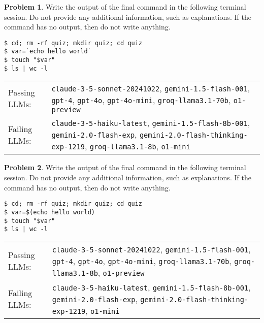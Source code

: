 \documentclass[10pt]{article}
\theoremstyle{definition}
\newtheorem{problem}{Problem}
\begin{document}
\begin{samepage}

\begin{problem}
Write the output of the final command in the following terminal session.
Do not provide any additional information,
such as explanations.
If the command has no output,
then do not write anything.

\end{problem}
\begin{lstlisting}
$ cd; rm -rf quiz; mkdir quiz; cd quiz
$ var=`echo hello world`
$ touch "$var"
$ ls | wc -l
\end{lstlisting}


\noindent
\begin{tabular}{p{1.0in}L{5in}}
Passing LLMs: & {\lstinline$claude-3-5-sonnet-20241022$}, {\lstinline$gemini-1.5-flash-001$}, {\lstinline$gpt-4$}, {\lstinline$gpt-4o$}, {\lstinline$gpt-4o-mini$}, {\lstinline$groq-llama3.1-70b$}, {\lstinline$o1-preview$} \\
Failing LLMs: & {\lstinline$claude-3-5-haiku-latest$}, {\lstinline$gemini-1.5-flash-8b-001$}, {\lstinline$gemini-2.0-flash-exp$}, {\lstinline$gemini-2.0-flash-thinking-exp-1219$}, {\lstinline$groq-llama3.1-8b$}, {\lstinline$o1-mini$} \\
\end{tabular}

\end{samepage}
\begin{samepage}

\begin{problem}
Write the output of the final command in the following terminal session.
Do not provide any additional information,
such as explanations.
If the command has no output,
then do not write anything.

\end{problem}
\begin{lstlisting}
$ cd; rm -rf quiz; mkdir quiz; cd quiz
$ var=$(echo hello world)
$ touch "$var"
$ ls | wc -l
\end{lstlisting}


\noindent
\begin{tabular}{p{1.0in}L{5in}}
Passing LLMs: & {\lstinline$claude-3-5-sonnet-20241022$}, {\lstinline$gemini-1.5-flash-001$}, {\lstinline$gpt-4$}, {\lstinline$gpt-4o$}, {\lstinline$gpt-4o-mini$}, {\lstinline$groq-llama3.1-70b$}, {\lstinline$groq-llama3.1-8b$}, {\lstinline$o1-preview$} \\
Failing LLMs: & {\lstinline$claude-3-5-haiku-latest$}, {\lstinline$gemini-1.5-flash-8b-001$}, {\lstinline$gemini-2.0-flash-exp$}, {\lstinline$gemini-2.0-flash-thinking-exp-1219$}, {\lstinline$o1-mini$} \\
\end{tabular}

\end{samepage}
\end{document}
